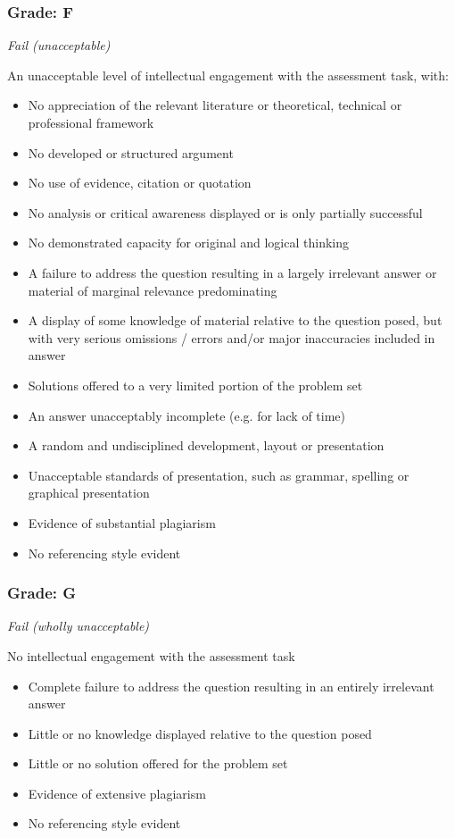 \subsubsection*{Grade: F}

\textit{Fail (unacceptable)}

An unacceptable level of intellectual engagement with
the assessment task, with:

\begin{itemize}
	\item No appreciation of the relevant literature or theoretical, technical or professional framework
	\item No developed or structured argument
	\item No use of evidence, citation or quotation
	\item No analysis or critical awareness displayed or is only partially successful
	\item No demonstrated capacity for original and logical thinking
	\item A failure to address the question resulting in a largely irrelevant answer or material of marginal relevance predominating
	\item A display of some knowledge of material relative to the question posed, but with very serious omissions / errors and/or major inaccuracies included in answer
	\item Solutions offered to a very limited portion of the problem set
	\item An answer unacceptably incomplete (e.g. for lack of time)
	\item A random and undisciplined development, layout or presentation
	\item Unacceptable standards of presentation, such as grammar, spelling or graphical presentation
	\item Evidence of substantial plagiarism
	\item No referencing style evident
\end{itemize}

\subsubsection*{Grade: G}

\textit{Fail (wholly unacceptable)}

No intellectual engagement with the assessment task

\begin{itemize}
	\item Complete failure to address the question resulting in an entirely irrelevant answer
	\item Little or no knowledge displayed relative to the question posed
	\item Little or no solution offered for the problem set
	\item Evidence of extensive plagiarism
	\item No referencing style evident
\end{itemize}

